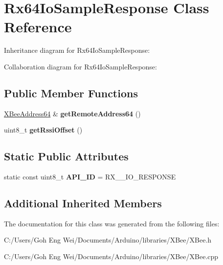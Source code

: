 \hypertarget{class_rx64_io_sample_response}{}\section{Rx64\+Io\+Sample\+Response Class Reference}
\label{class_rx64_io_sample_response}


Inheritance diagram for Rx64\+Io\+Sample\+Response\+:


Collaboration diagram for Rx64\+Io\+Sample\+Response\+:
\subsection*{Public Member Functions}
\begin{DoxyCompactItemize}
\item 
\hypertarget{class_rx64_io_sample_response_a820798904df6b3bef202444e349f94dd}{}\label{class_rx64_io_sample_response_a820798904df6b3bef202444e349f94dd} 
\hyperlink{class_x_bee_address64}{X\+Bee\+Address64} \& {\bfseries get\+Remote\+Address64} ()
\item 
\hypertarget{class_rx64_io_sample_response_abd780d5ca68b8389c44371522f775eae}{}\label{class_rx64_io_sample_response_abd780d5ca68b8389c44371522f775eae} 
uint8\+\_\+t {\bfseries get\+Rssi\+Offset} ()
\end{DoxyCompactItemize}
\subsection*{Static Public Attributes}
\begin{DoxyCompactItemize}
\item 
\hypertarget{class_rx64_io_sample_response_a1e2b3c987d892c3c3dbdeca907842de8}{}\label{class_rx64_io_sample_response_a1e2b3c987d892c3c3dbdeca907842de8} 
static const uint8\+\_\+t {\bfseries A\+P\+I\+\_\+\+ID} = R\+X\+\_\+\_\+\+I\+O\+\_\+\+R\+E\+S\+P\+O\+N\+SE
\end{DoxyCompactItemize}
\subsection*{Additional Inherited Members}


The documentation for this class was generated from the following files\+:\begin{DoxyCompactItemize}
\item 
C\+:/\+Users/\+Goh Eng Wei/\+Documents/\+Arduino/libraries/\+X\+Bee/X\+Bee.\+h\item 
C\+:/\+Users/\+Goh Eng Wei/\+Documents/\+Arduino/libraries/\+X\+Bee/X\+Bee.\+cpp\end{DoxyCompactItemize}
